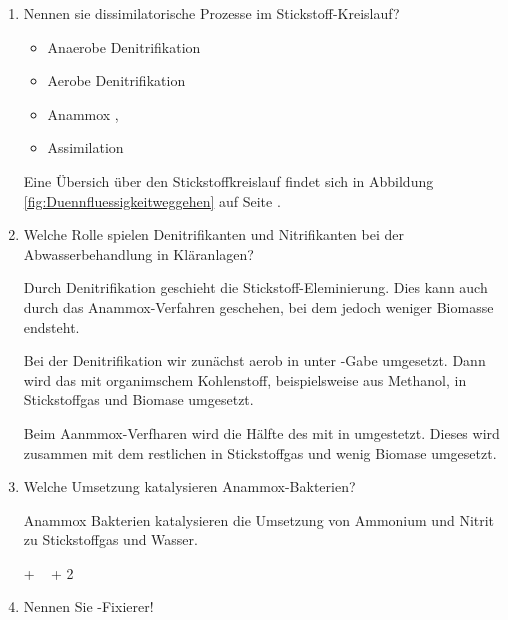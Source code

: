 \begin{enumerate}
	\item Nennen sie dissimilatorische Prozesse im Stickstoff-Kreislauf?
		
		\begin{itemize}
			\item Anaerobe Denitrifikation \hfill {} \textrightarrow {} \textrightarrow {}
			\item Aerobe Denitrifikation \hfill {} \textrightarrow {} \textrightarrow {}
			\item Anammox \hfill {}, \textrightarrow {}
			\item Assimilation \hfill {} \textrightarrow {}
		\end{itemize}

		Eine Übersich über den Stickstoffkreislauf findet sich in Abbildung \ref{fig:Duennfluessigkeitweggehen} auf Seite \pageref{fig:Duennfluessigkeitweggehen}.


	\item Welche Rolle spielen Denitrifikanten und Nitrifikanten bei der Abwasserbehandlung in Kläranlagen?

		Durch Denitrifikation geschieht die Stickstoff-Eleminierung.
		Dies kann auch durch das Anammox-Verfahren geschehen,
		bei dem jedoch weniger Biomasse endsteht.

		Bei der Denitrifikation wir zunächst aerob  in  unter -Gabe umgesetzt.
		Dann wird das  mit organimschem Kohlenstoff,
		beispielsweise aus Methanol,
		in Stickstoffgas und Biomase umgesetzt.

		Beim Aanmmox-Verfharen wird  die Hälfte des  mit  in umgestetzt.
		Dieses wird zusammen mit dem restlichen  in Stickstoffgas und wenig Biomase umgesetzt.

	\item Welche Umsetzung katalysieren Anammox-Bakterien?

		Anammox Bakterien katalysieren die Umsetzung von Ammonium und Nitrit zu Stickstoffgas und Wasser.\\
		\begin{center}
			 +  \textrightarrow \  + 2  
		\end{center}

	\item Nennen Sie -Fixierer!
	

\end{enumerate}
